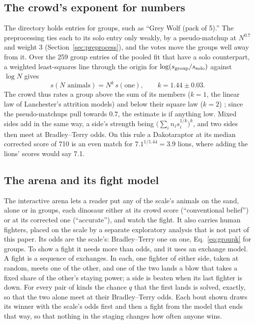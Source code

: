 \documentclass[11pt]{article}
\begin{document}
\subsection{The crowd's exponent for numbers}
\label{sec:groupk}
The directory holds entries for groups, such as ``Grey Wolf (pack of 5).'' The preprocessing ties each to its solo entry only weakly, by a pseudo-matchup at $N^{0.7}$ and weight 3 (Section~\ref{sec:preprocess}), and the votes move the groups well away from it. Over the 259 group entries of the pooled fit that have a solo counterpart, a weighted least-squares line through the origin for $\log(s_{\rm group}/s_{\rm solo})$ against $\log N$ gives
\begin{equation}
s(N\text{ animals})=N^{k}\,s(\text{one}),\qquad k=1.44\pm0.03 .
\label{eq:groupk}
\end{equation}
The crowd thus rates a group above the sum of its members ($k=1$, the linear law of Lanchester's attrition models) and below their square law ($k=2$) \cite{lanchester1916,adams2003lanchester}; since the pseudo-matchups pull towards $0.7$, the estimate is if anything low. Mixed sides add in the same way, a side's strength being $\bigl(\sum_i n_i s_i^{1/k}\bigr)^{k}$, and two sides then meet at Bradley--Terry odds. On this rule a Dakotaraptor at its median corrected score of 710 is an even match for $7.1^{1/1.44}=3.9$ lions, where adding the lions' scores would say 7.1.

\subsection{The arena and its fight model}
The interactive arena \cite{benanderArena2026} lets a reader put any of the scale's animals on the sand, alone or in groups, each dinosaur either at its crowd score (``conventional belief'') or at its corrected one (``accurate''), and watch the fight. It also carries human fighters, placed on the scale by a separate exploratory analysis that is not part of this paper. Its odds are the scale's: Bradley--Terry one on one, Eq.~\eqref{eq:groupk} for groups. To show a fight it needs more than odds, and it uses an exchange model. A fight is a sequence of exchanges. In each, one fighter of either side, taken at random, meets one of the other, and one of the two lands a blow that takes a fixed share of the other's staying power; a side is beaten when its last fighter is down. For every pair of kinds the chance $q$ that the first lands is solved, exactly, so that the two alone meet at their Bradley--Terry odds. Each bout shown draws its winner with the scale's odds first and then a fight from the model that ends that way, so that nothing in the staging changes how often anyone wins.
\end{document}
